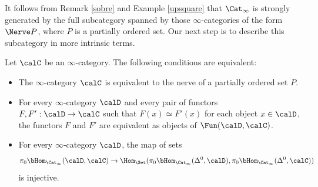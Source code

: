 
It follows from Remark \ref{sobre} and Example \ref{upsquare} that $\Cat_{\infty}$ is strongly generated by the full subcategory spanned by those $\infty$-categories of the form $\Nerve P$, where
$P$ is a partially ordered set. Our next step is to describe this subcategory in more intrinsic terms.

\begin{proposition}
Let $\calC$ be an $\infty$-category. The following conditions are equivalent:
\begin{itemize}
\item[$(1)$] The $\infty$-category $\calC$ is equivalent to the nerve of a partially ordered set $P$.
\item[$(2)$] For every $\infty$-category $\calD$ and every pair of functors
$F, F': \calD \rightarrow \calC$ such that $F(x) \simeq F'(x)$ for each object $x \in \calD$, 
the functors $F$ and $F'$ are equivalent as objects of $\Fun(\calD, \calC)$.
\item[$(3)$] For every $\infty$-category $\calD$, the map of sets
$$ \pi_0 \bHom_{\Cat_{\infty}}( \calD, \calC)
\rightarrow \Hom_{ \Set}( \pi_0 \bHom_{ \Cat_{\infty}}( \Delta^0, \calD),
\pi_0 \bHom_{ \Cat_{\infty} }( \Delta^0, \calC) )$$
is injective.
\end{itemize}
\end{proposition}

